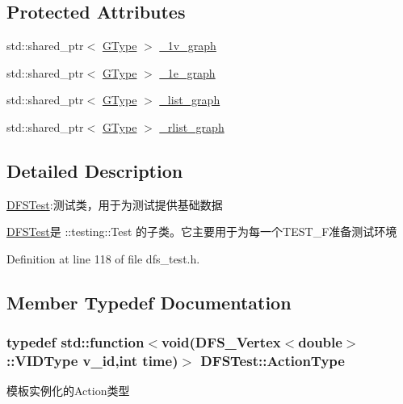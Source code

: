 \subsection*{Protected Attributes}
\begin{DoxyCompactItemize}
\item 
std\+::shared\+\_\+ptr$<$ \hyperlink{class_d_f_s_test_a32b63a9c79f6f7e7021daacf076a1512}{G\+Type} $>$ \hyperlink{class_d_f_s_test_a4dbae7784992bee522457b53da2141c2}{\+\_\+1v\+\_\+graph}
\item 
std\+::shared\+\_\+ptr$<$ \hyperlink{class_d_f_s_test_a32b63a9c79f6f7e7021daacf076a1512}{G\+Type} $>$ \hyperlink{class_d_f_s_test_ae5351e523345888ffc64aa892d93d3c2}{\+\_\+1e\+\_\+graph}
\item 
std\+::shared\+\_\+ptr$<$ \hyperlink{class_d_f_s_test_a32b63a9c79f6f7e7021daacf076a1512}{G\+Type} $>$ \hyperlink{class_d_f_s_test_a9607eac5350c4cdd449c353fed482efc}{\+\_\+list\+\_\+graph}
\item 
std\+::shared\+\_\+ptr$<$ \hyperlink{class_d_f_s_test_a32b63a9c79f6f7e7021daacf076a1512}{G\+Type} $>$ \hyperlink{class_d_f_s_test_a93a79d0654eb82517990c8f5419148a8}{\+\_\+rlist\+\_\+graph}
\end{DoxyCompactItemize}


\subsection{Detailed Description}
\hyperlink{class_d_f_s_test}{D\+F\+S\+Test}\+:测试类，用于为测试提供基础数据 

{\ttfamily \hyperlink{class_d_f_s_test}{D\+F\+S\+Test}}是 {\ttfamily \+::testing\+::\+Test} 的子类。它主要用于为每一个{\ttfamily T\+E\+S\+T\+\_\+\+F}准备测试环境 

Definition at line 118 of file dfs\+\_\+test.\+h.



\subsection{Member Typedef Documentation}
\hypertarget{class_d_f_s_test_ac4c131b9b4f9de55192b1c634dc1c37f}{}
\subsubsection[{Action\+Type}]{\setlength{\rightskip}{0pt plus 5cm}typedef std\+::function$<$void({\bf D\+F\+S\+\_\+\+Vertex}$<$double$>$\+::V\+I\+D\+Type v\+\_\+id,int time)$>$ {\bf D\+F\+S\+Test\+::\+Action\+Type}}\label{class_d_f_s_test_ac4c131b9b4f9de55192b1c634dc1c37f}
模板实例化的\+Action类型 

